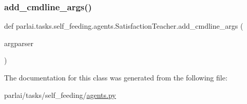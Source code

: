 \subsubsection{\texorpdfstring{add\+\_\+cmdline\+\_\+args()}{add\_cmdline\_args()}}
{\footnotesize\ttfamily def parlai.\+tasks.\+self\+\_\+feeding.\+agents.\+Satisfaction\+Teacher.\+add\+\_\+cmdline\+\_\+args (\begin{DoxyParamCaption}\item[{}]{argparser }\end{DoxyParamCaption})\hspace{0.3cm}{\ttfamily [static]}}



The documentation for this class was generated from the following file\+:\begin{DoxyCompactItemize}
\item 
parlai/tasks/self\+\_\+feeding/\hyperlink{parlai_2tasks_2self__feeding_2agents_8py}{agents.\+py}\end{DoxyCompactItemize}
